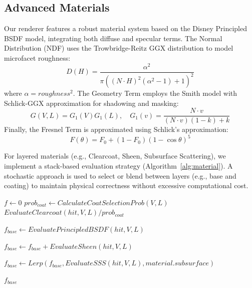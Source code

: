 \documentclass[sigconf]{acmart}
\begin{document}
\subsection{Advanced Materials}
Our renderer features a robust material system based on the Disney Principled BSDF model, integrating both diffuse and specular terms.
The Normal Distribution (NDF) uses the Trowbridge-Reitz GGX distribution to model microfacet roughness:
\begin{equation}
D(H) = \frac{\alpha^2}{\pi ((N \cdot H)^2 (\alpha^2 - 1) + 1)^2}
\end{equation}
where $\alpha = roughness^2$.
The Geometry Term employs the Smith model with Schlick-GGX approximation for shadowing and masking:
\begin{equation}
G(V, L) = G_1(V) G_1(L), \quad G_1(v) = \frac{N \cdot v}{(N \cdot v)(1 - k) + k}
\end{equation}
Finally, the Fresnel Term is approximated using Schlick's approximation:
\begin{equation}
F(\theta) = F_0 + (1 - F_0)(1 - \cos\theta)^5
\end{equation}

For layered materials (e.g., Clearcoat, Sheen, Subsurface Scattering), we implement a stack-based evaluation strategy (Algorithm~\ref{alg:material}). A stochastic approach is used to select or blend between layers (e.g., base and coating) to maintain physical correctness without excessive computational cost.

\begin{algorithm}[H]
\caption{Layered Material Evaluation}
\begin{algorithmic}[1]
\State $f \gets 0$
    \State $prob_{coat} \gets CalculateCoatSelectionProb(V, L)$
        \State \Return $EvaluateClearcoat(hit, V, L) / prob_{coat}$
    \EndIf
\EndIf

\State $f_{base} \gets EvaluatePrincipledBSDF(hit, V, L)$

    \State $f_{base} \gets f_{base} + EvaluateSheen(hit, V, L)$
\EndIf

    \State $f_{base} \gets Lerp(f_{base}, EvaluateSSS(hit, V, L), material.subsurface)$
\EndIf

\State \Return $f_{base}$
\end{algorithmic}
\label{alg:material}
\end{algorithm}
\end{document}
